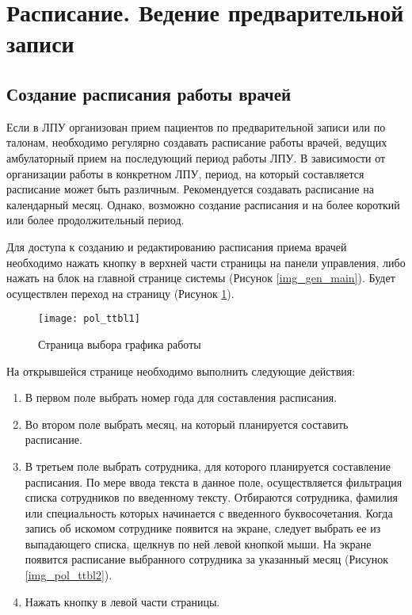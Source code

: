 \newpage
\section{Расписание. Ведение предварительной записи}

\subsection{Создание расписания работы врачей} \label{pol_ttbl_new}

Если в ЛПУ организован прием пациентов по предварительной записи или по талонам, необходимо регулярно создавать расписание работы врачей, ведущих амбулаторный прием на последующий период работы ЛПУ. В зависимости от организации работы в конкретном ЛПУ, период, на который составляется расписание может быть различным. Рекомендуется создавать расписание на календарный месяц. Однако, возможно создание расписания и на более короткий или более продолжительный период.

Для доступа к созданию и редактированию расписания приема врачей необходимо нажать кнопку  в верхней части страницы на панели управления, либо нажать на блок  на главной странице системы (Рисунок \ref{img_gen_main}). Будет осуществлен переход на страницу  (Рисунок \ref{img_pol_ttbl1}).

\begin{figure}[ht]\centering
 \texttt{[image: pol\_ttbl1]}
 \caption{Страница выбора графика работы}
 \label{img_pol_ttbl1}
\end{figure}

На открывшейся странице необходимо выполнить следующие действия:
\begin{enumerate}
 \item В первом поле выбрать номер года для составления расписания.
 \item Во втором поле выбрать месяц, на который планируется составить расписание.
 \item В третьем поле выбрать сотрудника, для которого планируется составление расписания. По мере ввода текста в данное поле, осуществляется фильтрация списка сотрудников по введенному тексту. Отбираются сотрудника, фамилия или специальность которых начинается с введенного буквосочетания. Когда запись об искомом сотруднике появится на экране, следует выбрать ее из выпадающего списка, щелкнув по ней левой кнопкой мыши. На экране появится расписание выбранного сотрудника за указанный месяц (Рисунок \ref{img_pol_ttbl2}). 
 \item Нажать кнопку  в левой части страницы. 
\end{enumerate}

